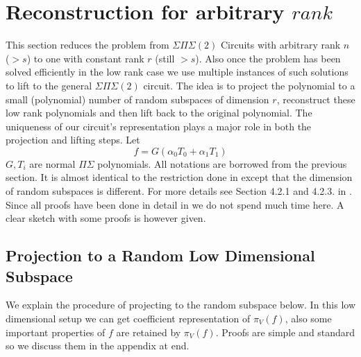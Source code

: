 \documentclass[letterpaper,USenglish,numberwithinsect]{lipics}
\begin{document}
\section{Reconstruction for arbitrary $rank$}\label{highdimrecon}
This section reduces the problem from $\Sigma\Pi\Sigma(2)$ Circuits with
arbitrary rank $n$ ($> s$) to one with
constant rank $r$ (still $> s$).  Also once the problem has been solved
efficiently in the low rank case
we use multiple instances of such solutions to lift to the general
$\Sigma\Pi\Sigma(2)$ circuit. The idea is to project the polynomial to a small (polynomial) number of
random subspaces of dimension $r$, reconstruct these low rank polynomials and then lift back to the original
polynomial. The uniqueness of
our circuit's representation plays a major role in both the projection and
lifting steps. Let
\[
 f = G(\alpha_0 T_0 + \alpha_1 T_1)
\]
$G,T_i$ are normal $\Pi\Sigma$ polynomials. All notations are borrowed from the previous section.
It is almost identical to the restriction done in \cite{Shpilka07} except that the dimension of random subspaces is different.
For more details see Section 4.2.1 and 4.2.3. in \cite{Shpilka07}. Since all proofs have been done in detail in
\cite{Shpilka07} we do not spend much time here. A clear sketch with some proofs is however given.

\subsection{Projection to a Random Low Dimensional Subspace}\label{projectrandom}
We explain the procedure of projecting to the random subspace below. In this low
dimensional setup we can get coefficient
representation of $\pi_V(f)$, also some important properties of $f$ are retained by
$\pi_V(f)$. Proofs are simple and standard so we discuss them in the appendix at
end.\\
\end{document}
